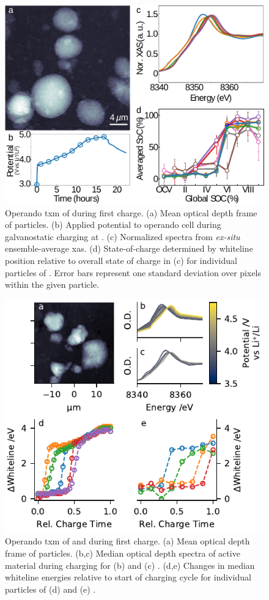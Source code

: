 \documentclass{article}
\begin{document}
\begin{figure}
  \includegraphics{figures/nca_txm.pdf}
  \caption{Operando \gls{txm} of \nca{} during first charge. (a) Mean
    optical depth frame of \nca{} particles. (b) Applied potential to
    operando cell during galvanostatic charging at . (c) Normalized spectra from \emph{ex-situ}
    ensemble-average \gls{xas}. (d) State-of-charge determined by
    whiteline position relative to overall state of charge in (c) for
    individual particles of \nca{}. Error bars represent one standard
    deviation over pixels within the given particle.}
\end{figure}

\begin{figure}
  \includegraphics{figures/nmc_txm.pdf}
  \caption{Operando \gls{txm} of \nmc[333]{} and \nmc[532]{} during
    first charge. (a) Mean optical depth frame of \nmc[333]{}
    particles. (b,c) Median optical depth spectra of active material
    during charging for (b) \nmc[333]{} and (c) \nmc[532]{}. (d,e)
    Changes in median whiteline energies relative to start of charging
    cycle for individual particles of (d) \nmc[333] and (e)
    \nmc[532]{}.}
\end{figure}
\end{document}
